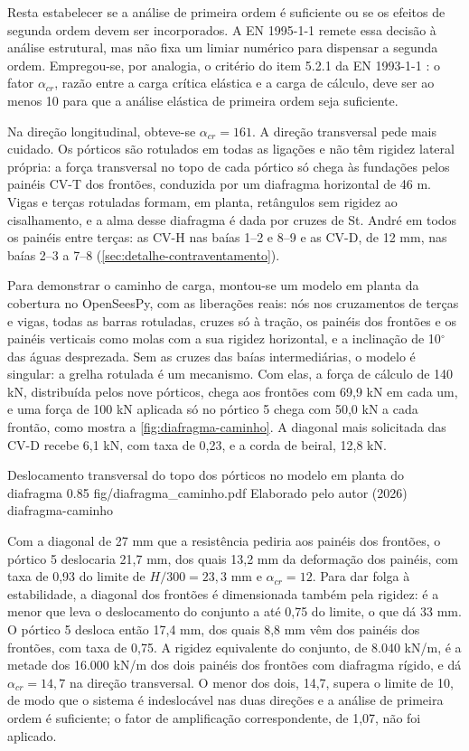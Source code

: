 Resta estabelecer se a análise de primeira ordem é suficiente ou se os efeitos
de segunda ordem devem ser incorporados. A EN 1995-1-1 \cite{EN1995-1-1:2004}
remete essa decisão à análise estrutural, mas não fixa um limiar numérico para
dispensar a segunda ordem. Empregou-se, por analogia, o critério do item 5.2.1
da EN 1993-1-1 \cite{EN1993-1-1:2005}: o fator $\alpha_{cr}$, razão entre a
carga crítica elástica e a carga de cálculo, deve ser ao menos 10 para que a
análise elástica de primeira ordem seja suficiente.

Na direção longitudinal, obteve-se $\alpha_{cr} = 161$. A direção transversal
pede mais cuidado. Os pórticos são rotulados em todas as ligações e não têm
rigidez lateral própria: a força transversal no topo de cada pórtico só chega
às fundações pelos painéis CV-T dos frontões, conduzida por um diafragma
horizontal de 46 m. Vigas e terças rotuladas formam, em planta, retângulos sem
rigidez ao cisalhamento, e a alma desse diafragma é dada por cruzes de
St. André em todos os painéis entre terças: as CV-H nas baías 1--2 e 8--9 e as
CV-D, de 12 mm, nas baías 2--3 a 7--8 (\autoref{sec:detalhe-contraventamento}).

Para demonstrar o caminho de carga, montou-se um modelo em planta da cobertura no
OpenSeesPy, com as liberações reais: nós nos cruzamentos de terças e vigas, todas
as barras rotuladas, cruzes só à tração, os painéis dos frontões e os painéis
verticais como molas com a sua rigidez horizontal, e a inclinação de 10$^{\circ}$
das águas desprezada. Sem as cruzes das baías intermediárias, o modelo é singular:
a grelha rotulada é um mecanismo. Com elas, a força de cálculo de 140 kN,
distribuída pelos nove pórticos, chega aos frontões com 69,9 kN em cada um, e uma
força de 100 kN aplicada só no pórtico 5 chega com 50,0 kN a cada frontão, como
mostra a \autoref{fig:diafragma-caminho}. A diagonal mais solicitada das CV-D
recebe 6,1 kN, com taxa de 0,23, e a corda de beiral, 12,8 kN.

\figura
{Deslocamento transversal do topo dos pórticos no modelo em planta do diafragma}
{0.85}
{fig/diafragma_caminho.pdf}
{Elaborado pelo autor (2026)}
{diafragma-caminho}
{}
{}

Com a diagonal de 27 mm que a resistência pediria aos painéis dos frontões, o
pórtico 5 deslocaria 21,7 mm, dos quais 13,2 mm da deformação dos painéis, com
taxa de 0,93 do limite de $H/300 = 23{,}3$ mm e $\alpha_{cr} = 12$. Para dar folga
à estabilidade, a diagonal dos frontões é dimensionada também pela rigidez: é a
menor que leva o deslocamento do conjunto a até 0,75 do limite, o que dá 33 mm. O
pórtico 5 desloca então 17,4 mm, dos quais 8,8 mm vêm dos painéis dos frontões,
com taxa de 0,75. A rigidez
equivalente do conjunto, de 8.040 kN/m, é a metade dos 16.000 kN/m dos dois
painéis dos frontões com diafragma rígido, e dá $\alpha_{cr} = 14{,}7$ na
direção transversal. O menor dos dois, 14,7, supera o limite de 10, de modo que o
sistema é indeslocável nas duas direções e a análise de primeira ordem é
suficiente; o fator de amplificação correspondente, de 1,07, não foi aplicado.

